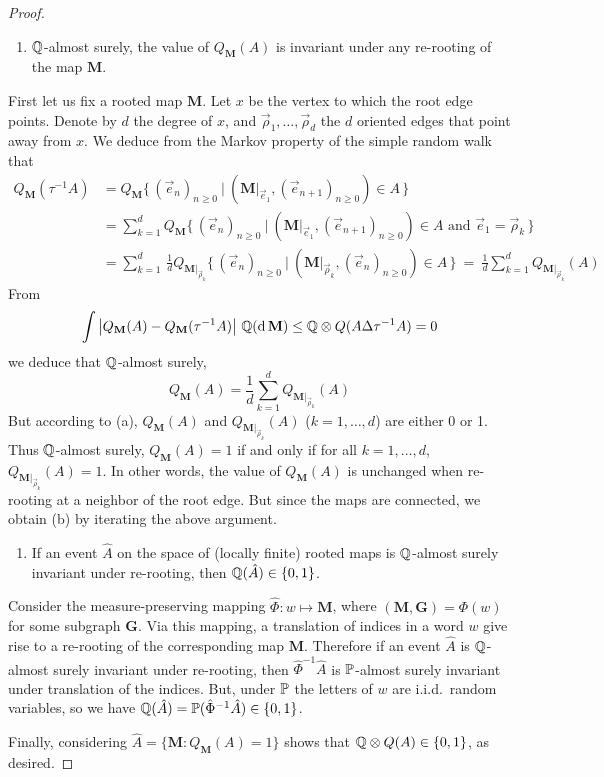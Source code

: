 \documentclass[a4paper]{article}
\newcommand*{\map}{\mathbf}
\newcommand*{\m}{\map{M}}
\newcommand*{\QM}{Q_{\map{M}}}
\newcommand*{\QQ}{\proba[Q]\otimes Q}
\newcommand*{\ve}[1][e]{\vec{#1}}
\newcommand*{\ven}[1][]{(\vec{e}_{n#1})_{n\ge 0}}
\begin{document}
\begin{proof}
\begin{enumerate}[resume,label=(\alph*)]
\item	$\proba[Q]$-almost surely, the value of $\QM(A)$ is invariant under any re-rooting of the map $\m$.
\end{enumerate}
First let us fix a rooted map $\map{M}$.
Let $x$ be the vertex to which the root edge points.
Denote by $d$ the degree of $x$, and $\vec{\rho}_1,\ldots,\vec{\rho}_d$ the $d$ oriented edges that point away from $x$.
We deduce from the Markov property of the simple random walk that
\newcommand*{\bset}[2]{\big\{\,#1\ \big|\ #2\,\big\}}
\begin{align*}
\QM(\tau^{-1}A) &= \QM\bset{ \ven }{ (\m|_{\ve_1},\ven[+1])\in A }
\\				&= \sum_{k=1}^d \QM\bset{ \ven }{ (\m|_{\ve_1},\ven[+1])\in A 
									\text{ and } \ve_1 = \vec{\rho}_k }
\\				&= \sum_{k=1}^d\, \frac{1}{d} Q_{\m|_{\vec{\rho}_k}}\!\!
											\bset{ \ven }{ (\m|_{\vec{\rho}_k},\ven)\in A }
\ =\ \frac{1}{d} \sum_{k=1}^d Q_{\m|_{\vec{\rho}_k}}\!(A)
\end{align*}
From
$$
	\int \abs{\QM(A) - \QM(\tau^{-1}A)} \, \proba[Q](\dd \m)
\le \QQ(A\Delta \tau^{-1}A) =0
$$
we deduce that $\proba[Q]$-almost surely,
$$
	\QM(A) = \frac{1}{d} \sum_{k=1}^d Q_{\m|_{\vec{\rho}_k}}\!(A)
$$
But according to (a), $\QM(A)$ and $Q_{\m|_{\vec{\rho}_k}}\!(A)$ ($k=1,\ldots,d$) are either 0 or 1.
Thus $\proba[Q]$-almost surely, $\QM(A) = 1$ if and only if for all $k=1,\ldots,d$, $Q_{\m|_{\vec{\rho}_k}}\!(A)=1$.
In other words, the value of $\QM(A)$ is unchanged when re-rooting at a neighbor of the root edge.
But since the maps are connected, we obtain (b) by iterating the above argument.


\begin{enumerate}[resume,label=(\alph*)]
\item 	If an event $\hat{A}$ on the space of (locally finite) rooted maps is $\proba[Q]$-almost surely invariant under re-rooting, then $\proba[Q](\hat{A})\in\{0,1\}$.
\end{enumerate}
Consider the measure-preserving mapping $\hat{\Phi}:w\mapsto \m$, where $(\m,\map{G})=\Phi(w)$ for some subgraph $\map{G}$.
Via this mapping, a translation of indices in a word $w$ give rise to a re-rooting of the corresponding map $\m$.
Therefore if an event $\hat{A}$ is $\proba[Q]$-almost surely invariant under re-rooting, then $\hat{\Phi}^{-1}\!\hat{A}$ is $\proba$-almost surely invariant under translation of the indices.
But, under $\proba$ the letters of $w$ are i.i.d.\ random variables, so we have $\proba[Q](\hat{A}) = \proba(\hat{\Phi}^{-1}\hat{A})\in\{0,1\}$.

\medskip\noindent
Finally, considering $\hat{A}=\{\m : \QM(A)=1\}$ shows that $\QQ(A)\in\{0,1\}$, as desired.
\end{proof}
\end{document}

